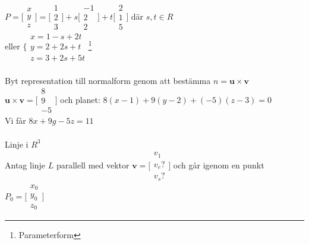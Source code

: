 \documentclass{article}
\begin{document}
\(P = \bigl[\begin{smallmatrix}
x \\ y \\ z
\end{smallmatrix} \bigr] = \bigl[\begin{smallmatrix}
1 \\ 2 \\ 3
\end{smallmatrix} \bigr] + s \bigl[\begin{smallmatrix}
-1 \\ 2 \\ 2
\end{smallmatrix} \bigr] + t \bigl[\begin{smallmatrix}
2 \\ 1 \\ 5
\end{smallmatrix} \bigr] \) där \(s, t \in R \)\\
eller \(\bigl\{\begin{smallmatrix}
x = 1 - s + 2t \\ y = 2 + 2s + t \\ z = 3 + 2s + 5t
\end{smallmatrix} \)\footnote{Parameterform}\\
\\
Byt representation till normalform genom att bestämma \(n = \mathbf{u} \times \mathbf{v}\)\\
\(\mathbf{u} \times \mathbf{v} = \bigl[\begin{smallmatrix}
8 \\ 9 \\ -5
\end{smallmatrix} \bigr] \) och planet: \(8(x-1) + 9(y-2) + (-5)(z-3) = 0 \)\\
Vi får \(8x + 9g - 5z = 11 \)\\
\\
Linje i \(R^3\)\\
Antag linje \(L\) parallell med vektor \(\mathbf{v} = \bigl[\begin{smallmatrix}
v_1 \\ v_e? \\ v_s?
\end{smallmatrix} \bigr] \) och går igenom en punkt \(P_0 = \bigl[\begin{smallmatrix}
x_0 \\ y_0 \\ z_0
\end{smallmatrix} \bigr] \)\\
\end{document}

